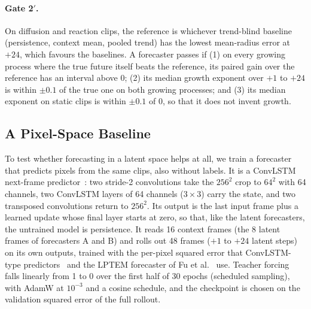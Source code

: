 \paragraph{Gate 2$'$.} On diffusion and reaction clips, the reference is whichever
trend-blind baseline (persistence, context mean, pooled trend) has the lowest mean-radius
error at $+24$, which favours the baselines. A forecaster passes if (1) on every growing
process where the true future itself beats the reference, its paired gain over the
reference has an interval above 0; (2) its median growth exponent over $+1$ to $+24$ is
within $\pm 0.1$ of the true one on both growing processes; and (3) its median exponent on
static clips is within $\pm 0.1$ of 0, so that it does not invent growth.

\subsection{A Pixel-Space Baseline}
\label{sec:method-pixel}

To test whether forecasting in a latent space helps at all, we train a forecaster that
predicts pixels from the same clips, also without labels. It is a ConvLSTM next-frame
predictor~\cite{shi2015convlstm}: two stride-2 convolutions take the $256^2$ crop to
$64^2$ with 64 channels, two ConvLSTM layers of 64 channels ($3 \times 3$) carry the
state, and two transposed convolutions return to $256^2$. Its output is the last input
frame plus a learned update whose final layer starts at zero, so that, like the latent
forecasters, the untrained model is persistence. It reads 16 context frames (the 8 latent
frames of forecasters A and B) and rolls out 48 frames ($+1$ to $+24$ latent steps) on its
own outputs, trained with the per-pixel squared error that ConvLSTM-type
predictors~\cite{shi2015convlstm} and the LPTEM forecaster of Fu et
al.~\cite{fu2022insitu} use. Teacher forcing falls linearly from 1 to 0 over the first
half of 30 epochs (scheduled sampling), with AdamW at $10^{-3}$ and a cosine schedule, and
the checkpoint is chosen on the validation squared error of the full rollout.

